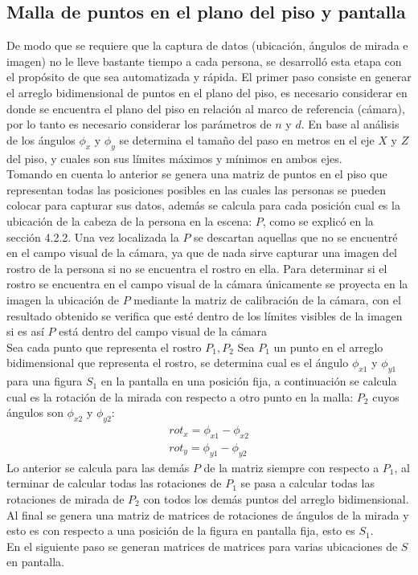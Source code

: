 	 \subsection{Malla de puntos en el plano del piso y pantalla}
	 De modo que se requiere que la captura de datos (ubicación, ángulos de mirada e imagen) no le lleve bastante tiempo a cada persona, se desarrolló esta etapa con el propósito de que sea automatizada y rápida.
	 El primer paso consiste en generar el arreglo bidimensional de puntos en el plano del piso, es necesario considerar en donde se encuentra el plano del piso en relación al marco de referencia (cámara), por lo tanto es necesario considerar los parámetros de $n$ y $d$. En base al análisis de los ángulos $\phi_x$ y $\phi_y$ se determina el tamaño del paso en metros en el eje $X$ y $Z$ del piso, y cuales son sus límites máximos y mínimos en ambos ejes. \\
	 Tomando en cuenta lo anterior se genera una matriz de puntos en el piso que representan todas las posiciones posibles en las cuales las personas se pueden colocar para capturar sus datos, además se calcula para cada posición cual es la ubicación de la cabeza de la persona en la escena: $P$, como se explicó en la sección 4.2.2. Una vez localizada la $P$ se descartan aquellas 
	 que no se encuentré en el campo visual de la cámara, ya que de nada sirve capturar una imagen del rostro de la persona si no se encuentra el rostro en ella. Para determinar si el rostro se encuentra en el campo visual de la cámara únicamente se proyecta en la imagen la ubicación de $P$ mediante la matriz de calibración de la cámara, con el resultado obtenido se verifica que esté dentro de los límites visibles de la imagen si es así $P$ está dentro del campo visual de la cámara \\
	 Sea cada punto que representa el rostro $P_1, P_2$
	 Sea $P_1$ un punto en el arreglo bidimensional que representa el rostro, se determina cual es el ángulo $\phi_{x1}$ y $\phi_{y1}$ para una figura $S_1$ en la pantalla en una posición fija, a continuación se calcula cual es la rotación de la mirada con respecto a otro punto en la malla: $P_2$ cuyos ángulos son $\phi_{x2}$ y $\phi_{y2}$:
	         \begin{eqnarray}
	         rot_x=\phi_{x1}-\phi_{x2}\\
	         rot_y=\phi_{y1}-\phi_{y2}
	         \end{eqnarray}
	 Lo anterior se calcula para las demás $P$ de la matriz siempre con respecto a $P_1$, al terminar de calcular todas las rotaciones de $P_1$ se pasa a calcular todas las rotaciones de mirada de $P_2$ con todos los demás puntos del arreglo bidimensional. Al final se genera una matriz de matrices de rotaciones de ángulos de la mirada y esto es con respecto a una posición de la figura en pantalla fija, esto es $S_1$.\\
	 En el siguiente paso se generan matrices de matrices para varias ubicaciones de $S$ en pantalla.
	 
